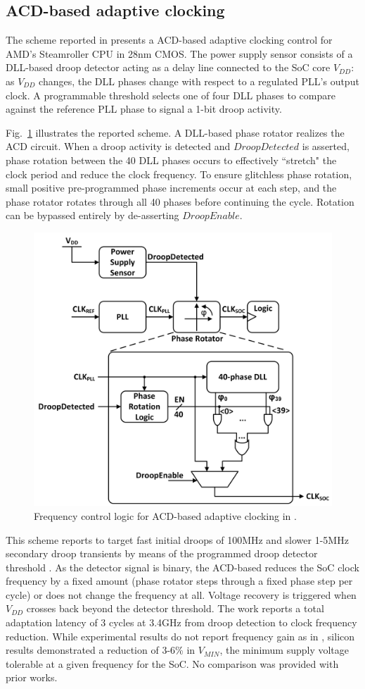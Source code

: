 \documentclass[twoside,9pt,journal,letterpage]{IEEEtran}
\begin{document}
\subsection{ACD-based adaptive clocking}
\label{sec:details_acd}
The scheme reported in \cite{wilcox2015} presents a ACD-based adaptive clocking control for AMD's Steamroller CPU in 28nm CMOS. The power supply sensor consists of a DLL-based droop detector acting as a delay line connected to the SoC core $V_{DD}$: as $V_{DD}$ changes, the DLL phases change with respect to a regulated PLL's output clock. A programmable threshold selects one of four DLL phases to compare against the reference PLL phase to signal a 1-bit droop activity.

Fig.\ \ref{fig:detail_acd} illustrates the reported scheme. A DLL-based phase rotator realizes the ACD circuit. When a droop activity is detected and $DroopDetected$ is asserted, phase rotation between the 40 DLL phases occurs to effectively ``stretch" the clock period and reduce the clock frequency. To ensure glitchless phase rotation, small positive pre-programmed phase increments occur at each step, and the phase rotator rotates through all 40 phases before continuing the cycle. Rotation can be bypassed entirely by de-asserting $DroopEnable$. 


\begin{figure}[h]
	\centering
	\includegraphics[width=0.7\columnwidth]{fig_detail_acd}
	\caption{Frequency control logic for ACD-based adaptive clocking in \cite{wilcox2015}.}
	\label{fig:detail_acd}
\end{figure}

This scheme reports to target fast initial droops of 100MHz and slower 1-5MHz secondary droop transients by means of the programmed droop detector threshold \cite{wilcox2015}. As the detector signal is binary, the ACD-based reduces the SoC clock frequency by a fixed amount (phase rotator steps through a fixed phase step per cycle) or does not change the frequency at all. Voltage recovery is triggered when $V_{DD}$ crosses back beyond the detector threshold. The work reports a total adaptation latency of 3 cycles at 3.4GHz from droop detection to clock frequency reduction. While experimental results do not report frequency gain as in \cite{hashimoto2018}, silicon results demonstrated a reduction of 3-6\% in $V_{MIN}$, the minimum supply voltage tolerable at a given frequency for the SoC. No comparison was provided with prior works.
\end{document}
